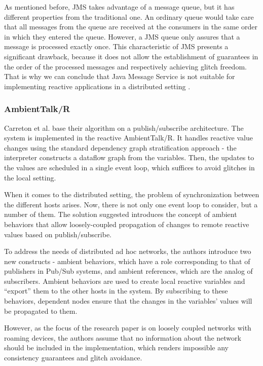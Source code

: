 \documentclass{sigplanconf}
\begin{document}
As mentioned before, JMS takes advantage of a message queue, but it has different properties from the traditional one. An ordinary queue would take care that all messages from the queue are received at the consumers in the same order in which they entered the queue. However, a JMS queue only assures that a message is processed exactly once. This characteristic of JMS presents a significant drawback, because it does not allow the establishment of guarantees in the order of the processed messages and respectively achieving glitch freedom. That is why we can conclude that Java Message Service is not suitable for implementing reactive applications in a distributed setting \cite{jms} \cite{jmsd}.

\subsubsection{AmbientTalk/R}
Carreton et al. \cite{loosely} base their algorithm on a publish/subscribe architecture. The system is implemented in the reactive AmbientTalk/R. It handles reactive value changes using the standard dependency graph stratification approach - the interpreter constructs a dataflow graph from the variables. Then, the updates to the values are scheduled in a single event loop, which suffices to avoid glitches in the local setting. 

When it comes to the distributed setting, the problem of synchronization between the different hosts arises. Now, there is not only one event loop to consider, but a number of them. The solution suggested introduces the concept of ambient behaviors that allow loosely-coupled propagation of changes to remote reactive values based on publish/subscribe. 

To address the needs of distributed ad hoc networks, the authors introduce two new constructs - ambient behaviors, which have a role corresponding to that of publishers in Pub/Sub systems, and ambient references, which are the analog of subscribers. Ambient behaviors are used to create local reactive variables and ``export'' them to the other hosts in the system. By subscribing to these behaviors, dependent nodes ensure that the changes in the variables' values will be propagated to them.

However, as the focus of the research paper is on loosely coupled networks with roaming devices, the authors assume that no information about the network should be included in the implementation, which renders impossible any consistency guarantees and glitch avoidance.
\end{document}
